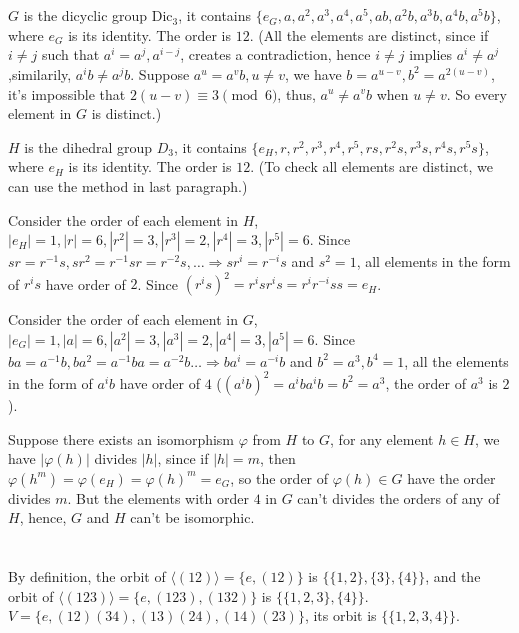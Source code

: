 \documentclass[12pt]{article}
\begin{document}
\section{}
$G$ is the dicyclic group $\mathrm{Dic}_3$, it contains $\{e_G,a,a^2,a^3,a^4,a^5,ab,a^2b,a^3b,a^4b,a^5b\}$, where $e_G$ is its identity. The order is $12$. (All the elements are distinct, since if $i\ne j$ such that $a^i=a^j,a^{i-j}$, creates a contradiction, hence $i\ne j$ implies $a^i\ne a^j$,similarily, $a^ib\ne a^jb$. Suppose $a^u=a^vb,u\ne v$, we have $b=a^{u-v},b^2=a^{2(u-v)}$, it's impossible that $2(u-v)\equiv 3\pmod6$, thus, $a^u\ne a^vb$ when $u\ne v$. So every element in $G$ is distinct.)

$H$ is the dihedral group $D_3$, it contains $\{e_H, r,r^2,r^3,r^4,r^5,rs,r^2s,r^3s,r^4s,r^5s\}$, where $e_H$ is its identity. The order is $12$. (To check all elements are distinct, we can use the method in last paragraph.)

Consider the order of each element in $H$, $|e_H|=1,|r|=6,|r^2|=3,|r^3|=2,|r^4|=3,|r^5|=6$. Since $sr=r^{-1}s, sr^2=r^{-1}sr=r^{-2}s,\dots\Rightarrow sr^{i}=r^{-i}s$ and $s^2=1$, all elements in the form of $r^is$ have order of $2$. Since $(r^is)^2=r^isr^is=r^ir^{-i}ss=e_H$.

Consider the order of each element in $G$, $|e_G|=1,|a|=6,|a^2|=3,|a^3|=2,|a^4|=3,|a^5|=6$. Since $ba=a^{-1}b, ba^2=a^{-1}ba=a^{-2}b\dots\Rightarrow ba^{i}=a^{-i}b$ and $b^2=a^3,b^4=1$, all the elements in the form of $a^ib$ have order of $4$ ($(a^ib)^2=a^iba^ib=b^2=a^3$, the order of $a^3$ is $2$).

Suppose there exists an isomorphism $\varphi$ from $H$ to $G$, for any element $h\in H$, we have $|\varphi(h)|$ divides $|h|$, since if $|h|=m$, then $\varphi(h^m)=\varphi(e_H)=\varphi(h)^m=e_G$, so the order of $\varphi(h)\in G$ have the order divides $m$. But the elements with order $4$ in $G$ can't divides the orders of any of $H$, hence, $G$ and $H$ can't be isomorphic.

\section{}
\subsection{}
By definition, the orbit of $\langle (12)\rangle=\{e,(12)\}$ is $\{\{1,2\},\{3\},\{4\}\}$, and the orbit of $\langle (123)\rangle=\{e,(123),(132)\}$ is $\{\{1,2,3\},\{4\}\}$. $V=\{e,(12)(34),(13)(24),(14)(23)\}$, its orbit is $\{\{1,2,3,4\}\}$.
\end{document}
